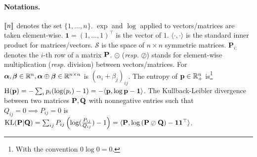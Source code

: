 \paragraph{Notations.} ${[\![n]\!]}$ denotes the set $\{1,...,n\}$. $\exp$ and $\log$ applied to vectors/matrices are taken element-wise. $\bm{1}
= (1,...,1)^\top$ is the vector of $1$. $\langle \cdot, \cdot \rangle$ is the standard inner product for matrices/vectors. $\mathcal{S}$ is the space of $n \times n$ symmetric matrices. $\mathbf{P}_{i:}$ denotes the $i$-th row of a matrix $\mathbf{P}$. $\odot$ (\textit{resp.} $\oslash$) stands for element-wise multiplication (\textit{resp.} division) between vectors/matrices. For $\bm{\alpha}, \bm{\beta} \in \mathbb{R}^n, \bm{\alpha} \oplus \bm{\beta} \in \mathbb{R}^{n \times n}$ is $(\alpha_i + \beta_j)_{ij}$. The entropy of $\mathbf{p} \in \mathbb{R}^{n}_+$ is\footnote{With the convention $0 \log 0 = 0$.} $\operatorname{H}(\mathbf{p}) = -\sum_{i} p_i(\log(p_i)-1) = -\langle \mathbf{p}, \log \mathbf{p} - \bm{1} \rangle$. The Kullback-Leibler divergence between two matrices $\mathbf{P}, \mathbf{Q}$ with nonnegative entries such that $Q_{ij} = 0 \implies P_{ij}=0$ is $\operatorname{KL}(\mathbf{P} | \mathbf{Q}) = \sum_{ij} P_{ij}\left(\log(\frac{P_{ij}}{Q_{ij}})-1\right) = \langle \mathbf{P}, \log \left(\mathbf{P} \oslash \mathbf{Q} \right) - \bm{1}\bm{1}^\top \rangle$.
%
